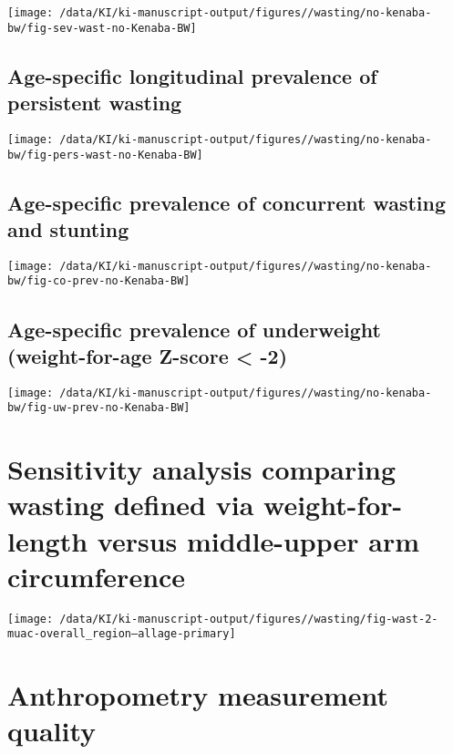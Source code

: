 \documentclass[
  9pt,
]{book}
\begin{document}
\texttt{[image: /data/KI/ki-manuscript-output/figures//wasting/no-kenaba-bw/fig-sev-wast-no-Kenaba-BW]}

\hypertarget{age-specific-longitudinal-prevalence-of-persistent-wasting-2}{%
\section{Age-specific longitudinal prevalence of persistent wasting}\label{age-specific-longitudinal-prevalence-of-persistent-wasting-2}}

\texttt{[image: /data/KI/ki-manuscript-output/figures//wasting/no-kenaba-bw/fig-pers-wast-no-Kenaba-BW]}

\hypertarget{age-specific-prevalence-of-concurrent-wasting-and-stunting-2}{%
\section{Age-specific prevalence of concurrent wasting and stunting}\label{age-specific-prevalence-of-concurrent-wasting-and-stunting-2}}

\texttt{[image: /data/KI/ki-manuscript-output/figures//wasting/no-kenaba-bw/fig-co-prev-no-Kenaba-BW]}

\hypertarget{age-specific-prevalence-of-underweight-weight-for-age-z-score--2-1}{%
\section{Age-specific prevalence of underweight (weight-for-age Z-score \textless{} -2)}\label{age-specific-prevalence-of-underweight-weight-for-age-z-score--2-1}}

\texttt{[image: /data/KI/ki-manuscript-output/figures//wasting/no-kenaba-bw/fig-uw-prev-no-Kenaba-BW]}

\hypertarget{muac}{%
\chapter{Sensitivity analysis comparing wasting defined via weight-for-length versus middle-upper arm circumference}\label{muac}}

\raggedright

\texttt{[image: /data/KI/ki-manuscript-output/figures//wasting/fig-wast-2-muac-overall\_region--allage-primary]}

\hypertarget{anthro}{%
\chapter{Anthropometry measurement quality}\label{anthro}}
\end{document}
